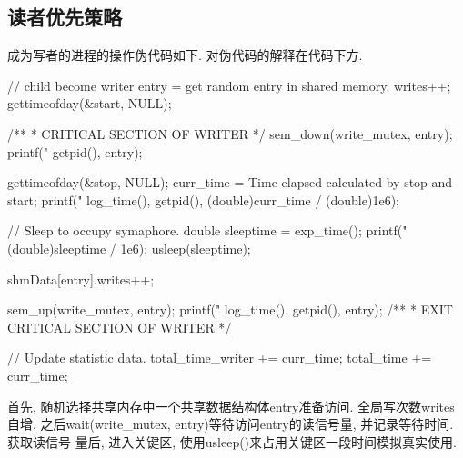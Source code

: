 \subsection{读者优先策略}
成为写者的进程的操作伪代码如下. 对伪代码的解释在代码下方.
\begin{code}
    // child become writer
    entry = get random entry in shared memory.
    writes++;
    gettimeofday(&start, NULL);

    /**
    * CRITICAL SECTION OF WRITER
    */
    sem_down(write_mutex, entry);
    printf("%
    getpid(), entry);

    gettimeofday(&stop, NULL);
    curr_time = Time elapsed calculated by stop and start;
    printf("%
    log_time(), getpid(), (double)curr_time / (double)1e6);

    // Sleep to occupy symaphore.
    double sleeptime = exp_time();
    printf("%
    (double)sleeptime / 1e6);
    usleep(sleeptime);

    shmData[entry].writes++;

    sem_up(write_mutex, entry);
    printf("%
    log_time(), getpid(), entry);
    /**
    * EXIT CRITICAL SECTION OF WRITER
    */

    // Update statistic data.
    total_time_writer += curr_time;
    total_time += curr_time;

\end{code}

首先, 随机选择共享内存中一个共享数据结构体entry准备访问. 全局写次数writes自增.
之后wait(write\_mutex, entry)等待访问entry的读信号量, 并记录等待时间. 获取读信号
量后, 进入关键区, 使用usleep()来占用关键区一段时间模拟真实使用. 